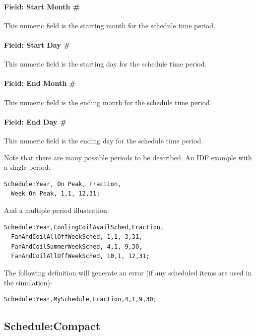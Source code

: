 \paragraph{Field: Start Month \#}\label{field-start-month}

This numeric field is the starting month for the schedule time period.

\paragraph{Field: Start Day \#}\label{field-start-day}

This numeric field is the starting day for the schedule time period.

\paragraph{Field: End Month \#}\label{field-end-month-000}

This numeric field is the ending month for the schedule time period.

\paragraph{Field: End Day \#}\label{field-end-day}

This numeric field is the ending day for the schedule time period.

Note that there are many possible periods to be described. An IDF example with a single period:

\begin{lstlisting}
Schedule:Year, On Peak, Fraction,
  Week On Peak, 1,1, 12,31;
\end{lstlisting}

And a multiple period illustration:

\begin{lstlisting}
Schedule:Year,CoolingCoilAvailSched,Fraction,
  FanAndCoilAllOffWeekSched, 1,1, 3,31,
  FanAndCoilSummerWeekSched, 4,1, 9,30,
  FanAndCoilAllOffWeekSched, 10,1, 12,31;
\end{lstlisting}

The following definition will generate an error (if any scheduled items are used in the simulation):

\begin{lstlisting}
Schedule:Year,MySchedule,Fraction,4,1,9,30;
\end{lstlisting}

\subsection{Schedule:Compact}\label{schedulecompact}

